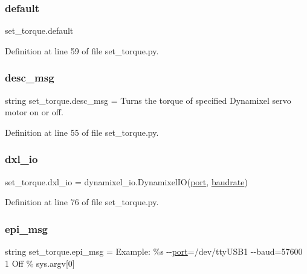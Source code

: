 \subsubsection{\texorpdfstring{default}{default}}
{\footnotesize\ttfamily set\+\_\+torque.\+default}



Definition at line 59 of file set\+\_\+torque.\+py.

\mbox{\label{namespaceset__torque_a6715e5416a3468b017ad49067131cf3f}} 
\subsubsection{\texorpdfstring{desc\+\_\+msg}{desc\_msg}}
{\footnotesize\ttfamily string set\+\_\+torque.\+desc\+\_\+msg = \textquotesingle{}Turns the torque of specified Dynamixel servo motor on or off.\textquotesingle{}}



Definition at line 55 of file set\+\_\+torque.\+py.

\mbox{\label{namespaceset__torque_a91411d9dc276feda6240d590df9d3c96}} 
\subsubsection{\texorpdfstring{dxl\+\_\+io}{dxl\_io}}
{\footnotesize\ttfamily set\+\_\+torque.\+dxl\+\_\+io = dynamixel\+\_\+io.\+Dynamixel\+IO(\hyperlink{namespaceset__torque_adbb76185d3bc8d9acc1d2d233efb3ef9}{port}, \hyperlink{namespaceset__torque_a5826fc0f8ce37034c1673138f0c219c1}{baudrate})}



Definition at line 76 of file set\+\_\+torque.\+py.

\mbox{\label{namespaceset__torque_a34aa95210a205aecf7fe7bef0517fbd9}} 
\subsubsection{\texorpdfstring{epi\+\_\+msg}{epi\_msg}}
{\footnotesize\ttfamily string set\+\_\+torque.\+epi\+\_\+msg = \textquotesingle{}Example\+: \%s -\/-\/\hyperlink{namespaceset__torque_adbb76185d3bc8d9acc1d2d233efb3ef9}{port}=/dev/tty\+U\+S\+B1 -\/-\/baud=57600 1 Off\textquotesingle{} \% sys.\+argv\mbox{[}0\mbox{]}}



